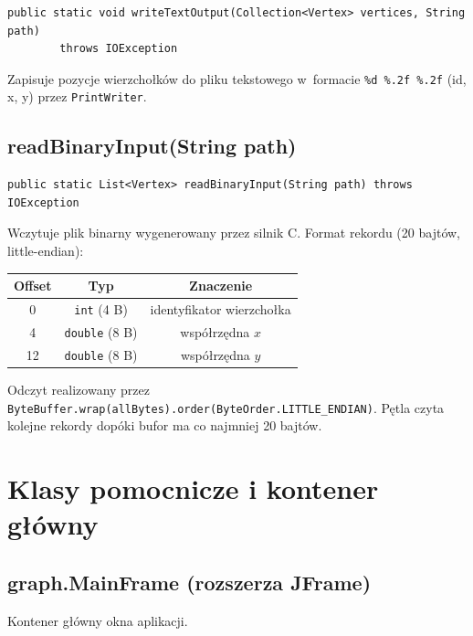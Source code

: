 \documentclass[12pt]{article}
\begin{document}
\begin{lstlisting}
public static void writeTextOutput(Collection<Vertex> vertices, String path)
        throws IOException
\end{lstlisting}

Zapisuje pozycje wierzchołków do pliku tekstowego w~formacie
\texttt{\%d \%.2f \%.2f} (id, x, y) przez \texttt{PrintWriter}.

\subsection{readBinaryInput(String path)}

\begin{lstlisting}
public static List<Vertex> readBinaryInput(String path) throws IOException
\end{lstlisting}

Wczytuje plik binarny wygenerowany przez silnik C. Format rekordu (20 bajtów,
little-endian):

\begin{center}
\begin{tabular}{|c|c|c|}
    \hline
    \textbf{Offset} & \textbf{Typ} & \textbf{Znaczenie} \\
    \hline
    0 & \texttt{int} (4 B) & identyfikator wierzchołka \\
    4 & \texttt{double} (8 B) & współrzędna $x$ \\
    12 & \texttt{double} (8 B) & współrzędna $y$ \\
    \hline
\end{tabular}
\end{center}

Odczyt realizowany przez \texttt{ByteBuffer.wrap(allBytes).order(ByteOrder.LITTLE\_ENDIAN)}.
Pętla czyta kolejne rekordy dopóki bufor ma co najmniej 20 bajtów.

\section{Klasy pomocnicze i kontener główny}

\subsection{graph.MainFrame (rozszerza JFrame)}

Kontener główny okna aplikacji.
\end{document}
